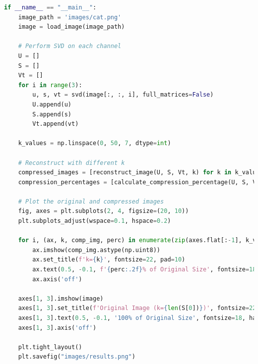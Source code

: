 \documentclass[12pt]{article}
\begin{document}
\begin{lstlisting}[language=Python, title={Python Code for SVD Compression}]
if __name__ == "__main__":
    image_path = 'images/cat.png'
    image = load_image(image_path)

    # Perform SVD on each channel
    U = []
    S = []
    Vt = []
    for i in range(3):
        u, s, vt = svd(image[:, :, i], full_matrices=False)
        U.append(u)
        S.append(s)
        Vt.append(vt)

    k_values = np.linspace(0, 50, 7, dtype=int)
    
    # Reconstruct with different k
    compressed_images = [reconstruct_image(U, S, Vt, k) for k in k_values]
    compression_percentages = [calculate_compression_percentage(U, S, Vt, k) for k in k_values]

    # Plot the original and compressed images
    fig, axes = plt.subplots(2, 4, figsize=(20, 10))
    plt.subplots_adjust(wspace=0.1, hspace=0.2)

    for i, (ax, k, comp_img, perc) in enumerate(zip(axes.flat[:-1], k_values, compressed_images, compression_percentages)):
        ax.imshow(comp_img.astype(np.uint8))
        ax.set_title(f'k={k}', fontsize=22, pad=10)
        ax.text(0.5, -0.1, f'{perc:.2f}% of Original Size', fontsize=18, ha='center', transform=ax.transAxes)
        ax.axis('off')

    axes[1, 3].imshow(image)
    axes[1, 3].set_title(f'Original Image (k={len(S[0])})', fontsize=22)
    axes[1, 3].text(0.5, -0.1, '100% of Original Size', fontsize=18, ha='center', transform=axes[1, 3].transAxes)
    axes[1, 3].axis('off')

    plt.tight_layout()
    plt.savefig("images/results.png")

    
\end{lstlisting}
\end{document}
